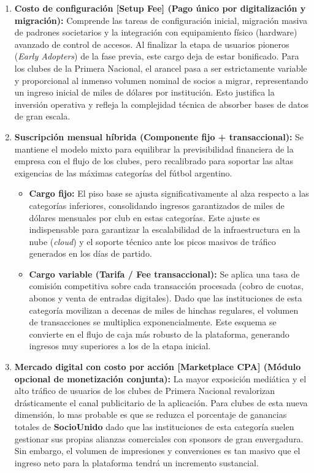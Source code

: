 \begin{enumerate}
 \item \textbf{Costo de configuración [Setup Fee] (Pago único por digitalización y migración):} Comprende las tareas de configuración inicial, migración masiva de padrones societarios y la integración con equipamiento físico (hardware) avanzado de control de accesos. Al finalizar la etapa de usuarios pioneros (\textit{Early Adopters}) de la fase previa, este cargo deja de estar bonificado. Para los clubes de la Primera Nacional, el arancel pasa a ser estrictamente variable y proporcional al inmenso volumen nominal de socios a migrar, representando un ingreso inicial de miles de dólares por institución. Esto justifica la inversión operativa y refleja la complejidad técnica de absorber bases de datos de gran escala.

  \item \textbf{Suscripción mensual híbrida (Componente fijo + transaccional):} Se mantiene el modelo mixto para equilibrar la previsibilidad financiera de la empresa con el flujo de los clubes, pero recalibrado para soportar las altas exigencias de las máximas categorías del fútbol argentino.
  \begin{itemize}
    \item \textbf{Cargo fijo:} El piso base se ajusta significativamente al alza respecto a las categorías inferiores, consolidando ingresos garantizados de miles de dólares mensuales por club en estas categorías. Este ajuste es indispensable para garantizar la escalabilidad de la infraestructura en la nube (\textit{cloud}) y el soporte técnico ante los picos masivos de tráfico generados en los días de partido.
    \item \textbf{Cargo variable (Tarifa / Fee transaccional):} Se aplica una tasa de comisión competitiva sobre cada transacción procesada (cobro de cuotas, abonos y venta de entradas digitales). Dado que las instituciones de esta categoría movilizan a decenas de miles de hinchas regulares, el volumen de transacciones se multiplica exponencialmente. Este esquema se convierte en el flujo de caja más robusto de la plataforma, generando ingresos muy superiores a los de la etapa inicial.
  \end{itemize}

  \item \textbf{Mercado digital con costo por acción [Marketplace CPA] (Módulo opcional de monetización conjunta):} La mayor exposición mediática y el alto tráfico de usuarios de los clubes de Primera Nacional revalorizan drásticamente el canal publicitario de la aplicación. Para clubes de esta nueva dimensión, lo mas probable es que se reduzca el porcentaje de ganancias totales de \textbf{SocioUnido} dado que las instituciones de esta categoría suelen gestionar sus propias alianzas comerciales con sponsors de gran envergadura. Sin embargo, el volumen de impresiones y conversiones es tan masivo que el ingreso neto para la plataforma tendrá un incremento sustancial.
\end{enumerate}

